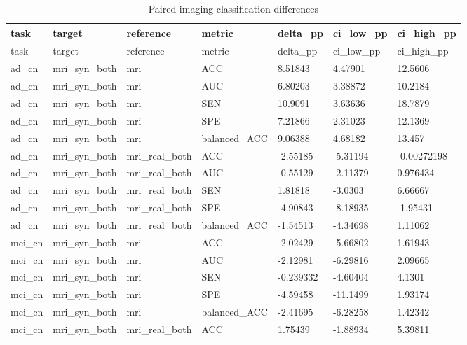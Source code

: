 \documentclass{article}
\begin{document}
\begin{landscape}
\begingroup
\footnotesize
\setlength{\tabcolsep}{4pt}
\begin{longtable}{lllllll}
\caption{Paired imaging classification differences}\label{tab:classification_comparisons}\\
\toprule
task & target & reference & metric & delta\_pp & ci\_low\_pp & ci\_high\_pp \\
\midrule
\endfirsthead
\toprule
task & target & reference & metric & delta\_pp & ci\_low\_pp & ci\_high\_pp \\
\midrule
\endhead
\bottomrule
\endfoot
ad\_cn & mri\_syn\_both & mri & ACC & 8.51843 & 4.47901 & 12.5606 \\
ad\_cn & mri\_syn\_both & mri & AUC & 6.80203 & 3.38872 & 10.2184 \\
ad\_cn & mri\_syn\_both & mri & SEN & 10.9091 & 3.63636 & 18.7879 \\
ad\_cn & mri\_syn\_both & mri & SPE & 7.21866 & 2.31023 & 12.1369 \\
ad\_cn & mri\_syn\_both & mri & balanced\_ACC & 9.06388 & 4.68182 & 13.457 \\
ad\_cn & mri\_syn\_both & mri\_real\_both & ACC & -2.55185 & -5.31194 & -0.00272198 \\
ad\_cn & mri\_syn\_both & mri\_real\_both & AUC & -0.55129 & -2.11379 & 0.976434 \\
ad\_cn & mri\_syn\_both & mri\_real\_both & SEN & 1.81818 & -3.0303 & 6.66667 \\
ad\_cn & mri\_syn\_both & mri\_real\_both & SPE & -4.90843 & -8.18935 & -1.95431 \\
ad\_cn & mri\_syn\_both & mri\_real\_both & balanced\_ACC & -1.54513 & -4.34698 & 1.11062 \\
mci\_cn & mri\_syn\_both & mri & ACC & -2.02429 & -5.66802 & 1.61943 \\
mci\_cn & mri\_syn\_both & mri & AUC & -2.12981 & -6.29816 & 2.09665 \\
mci\_cn & mri\_syn\_both & mri & SEN & -0.239332 & -4.60404 & 4.1301 \\
mci\_cn & mri\_syn\_both & mri & SPE & -4.59458 & -11.1499 & 1.93174 \\
mci\_cn & mri\_syn\_both & mri & balanced\_ACC & -2.41695 & -6.28258 & 1.42342 \\
mci\_cn & mri\_syn\_both & mri\_real\_both & ACC & 1.75439 & -1.88934 & 5.39811 \\

\end{longtable}
\end{landscape}
\end{document}
